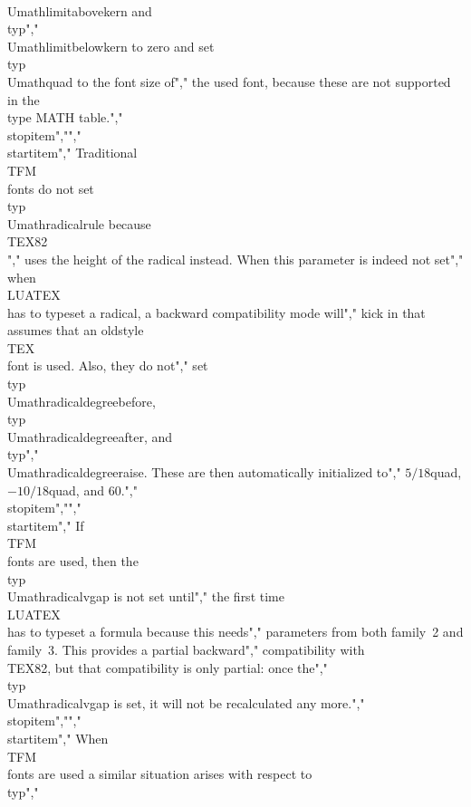 {\\Umathlimitabovekern} and \\typ","    {\\Umathlimitbelowkern} to zero and set \\typ {\\Umathquad} to the font size of","    the used font, because these are not supported in the \\type {MATH} table.","\\stopitem","","\\startitem","    Traditional \\TFM\\ fonts do not set \\typ {\\Umathradicalrule} because \\TEX82\\","    uses the height of the radical instead. When this parameter is indeed not set","    when \\LUATEX\\ has to typeset a radical, a backward compatibility mode will","    kick in that assumes that an oldstyle \\TEX\\ font is used. Also, they do not","    set \\typ {\\Umathradicaldegreebefore}, \\typ {\\Umathradicaldegreeafter}, and \\typ","    {\\Umathradicaldegreeraise}. These are then automatically initialized to","    $5/18$quad, $-10/18$quad, and 60.","\\stopitem","","\\startitem","    If \\TFM\\ fonts are used, then the \\typ {\\Umathradicalvgap} is not set until","    the first time \\LUATEX\\ has to typeset a formula because this needs","    parameters from both family~2 and family~3. This provides a partial backward","    compatibility with \\TEX82, but that compatibility is only partial: once the","    \\typ {\\Umathradicalvgap} is set, it will not be recalculated any more.","\\stopitem","","\\startitem","    When \\TFM\\ fonts are used a similar situation arises with respect to \\typ","    
